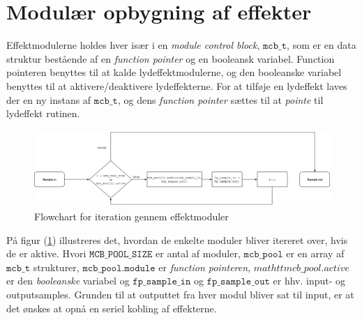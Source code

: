 \section{Modulær opbygning af effekter}
Effektmodulerne holdes hver især i en \textit{module control block}, $\mathtt{mcb\_t}$,  som er en data struktur bestående af en \textit{function pointer} og en booleansk variabel.
Function pointeren benyttes til at kalde lydeffektmodulerne, og den booleanske variabel benyttes til at aktivere/deaktivere lydeffekterne.\newline
For at tilføje en lydeffekt laves der en ny instans af $\mathtt{mcb\_t}$, og dens \textit{function pointer} sættes til at \textit{pointe} til lydeffekt rutinen.\newline
\begin{figure}[!ht]
	\centering
	\includegraphics[width=\textwidth]{billeder/Flowchart_for_effektmoduler.png}
	\caption{Flowchart for iteration gennem effektmoduler}
	\label{fig:effektmoduler}
\end{figure}

På figur (\ref{fig:effektmoduler}) illustreres det, hvordan de enkelte moduler bliver itereret over, hvis de er aktive.
Hvori $\mathtt{MCB\_POOL\_SIZE}$ er antal af moduler, $\mathtt{mcb\_pool}$ er en array af $\mathtt{mcb\_t}$ strukturer, $\mathtt{mcb\_pool.module}$ er \textit{function pointeren}, $mathtt{mcb\_pool.active}$ er den \textit{booleanske} variabel og $\mathtt{fp\_sample\_in}$ og $\mathtt{fp\_sample\_out}$ er hhv. input- og outputsamples.
Grunden til at outputtet fra hver modul bliver sat til input, er at det ønskes at opnå en seriel kobling af effekterne.

